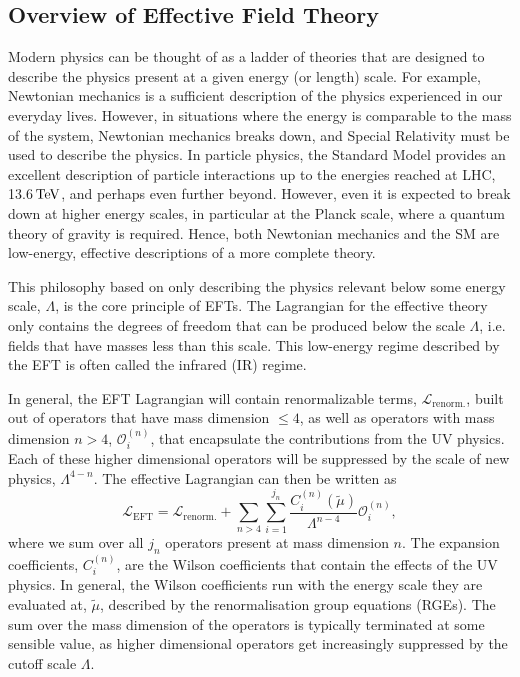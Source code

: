 \subsection{Overview of Effective Field Theory}

Modern physics can be thought of as a ladder of theories that are designed to describe the physics present at a given energy (or length) scale. For example, Newtonian mechanics is a sufficient description of the physics experienced in our everyday lives. However, in situations where the energy is comparable to the mass of the system, Newtonian mechanics breaks down, and Special Relativity must be used to describe the physics. In particle physics, the Standard Model provides an excellent description of particle interactions up to the energies reached at LHC, 13.6${\rm \,TeV}$, and perhaps even further beyond. However, even it is expected to break down at higher energy scales, in particular at the Planck scale, where a quantum theory of gravity is required. Hence, both Newtonian mechanics and the SM are low-energy, effective descriptions of a more complete theory.

This philosophy based on only describing the physics relevant below some energy scale, $\Lambda$, is the core principle of EFTs. The Lagrangian for the effective theory only contains the degrees of freedom that can be produced below the scale $\Lambda$, i.e. fields that have masses less than this scale. This low-energy regime described by the EFT is often called the infrared (IR) regime. 

In general, the EFT Lagrangian will contain renormalizable terms, $\mathcal{L}_\mathrm{renorm.}$,  built out of operators that have mass dimension $\leq 4$, as well as operators with mass dimension $n> 4$, $\mathcal{O}_i^{(n)}$, that encapsulate the contributions from the UV physics. Each of these higher dimensional operators will be suppressed by the scale of new physics, $\Lambda^{4-n}$. 
The effective Lagrangian can then be written as
\begin{equation}
    \mathcal{L}_\mathrm{EFT} = \mathcal{L}_\mathrm{renorm.} +  \sum_{n>4}   \sum_{i = 1}^{j_n} \frac{C_i^{(n)} (\tilde{\mu})}{\Lambda^{n-4}}\mathcal{O}_i^{(n)},
    \label{eq:EFT_Lagrangian}
\end{equation}
where we sum over all $j_n$ operators present at mass dimension $n$. The expansion coefficients, $C_i^{(n)}$, are the Wilson coefficients that contain the effects of the UV physics. In general, the Wilson coefficients run with the energy scale they are evaluated at, $\tilde{\mu}$, described by the renormalisation group equations (RGEs).
The sum over the mass dimension of the operators is typically terminated at some sensible value, as higher dimensional operators get increasingly suppressed by the cutoff scale $\Lambda$.

